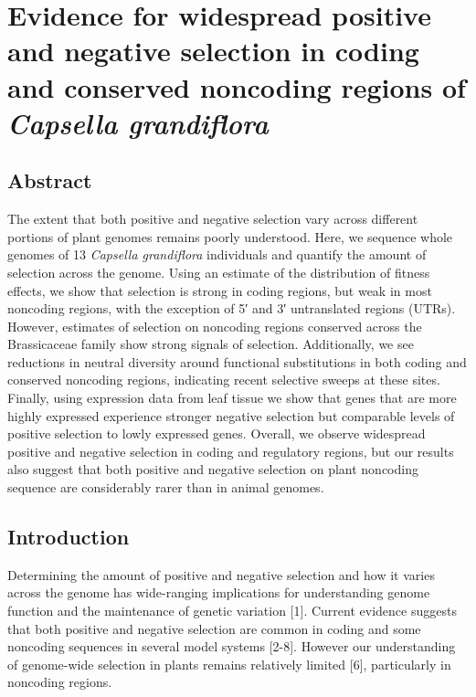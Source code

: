 \chapter{Evidence for widespread positive and negative selection in coding and conserved noncoding regions of \textit{Capsella grandiflora}}

\section{Abstract}
The extent that both positive and negative selection vary across different portions of plant genomes remains poorly understood. Here, we sequence whole genomes of 13 \textit{Capsella grandiflora} individuals and quantify the amount of selection across the genome. Using an estimate of the distribution of fitness effects, we show that selection is strong in coding regions, but weak in most noncoding regions, with the exception of 5′ and 3′ untranslated regions (UTRs). However, estimates of selection on noncoding regions conserved across the Brassicaceae family show strong signals of selection. Additionally, we see reductions in neutral diversity around functional substitutions in both coding and conserved noncoding regions, indicating recent selective sweeps at these sites. Finally, using expression data from leaf tissue we show that genes that are more highly expressed experience stronger negative selection but comparable levels of positive selection to lowly expressed genes. Overall, we observe widespread positive and negative selection in coding and regulatory regions, but our results also suggest that both positive and negative selection on plant noncoding sequence are considerably rarer than in animal genomes.

\section{Introduction}
Determining the amount of positive and negative selection and how it varies across the genome has wide-ranging implications for understanding genome function and the maintenance of genetic variation [1]. Current evidence suggests that both positive and negative selection are common in coding and some noncoding sequences in several model systems [2-8]. However our understanding of genome-wide selection in plants remains relatively limited [6], particularly in noncoding regions. 

